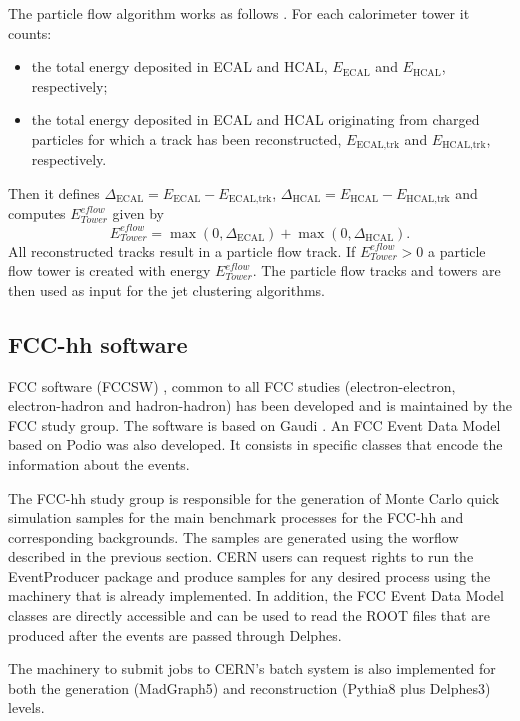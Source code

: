 The particle flow algorithm works as follows \cite{Delphes}. For each calorimeter tower it counts:
\begin{itemize}
	\item the total energy deposited in ECAL and HCAL, $E_{\text{ECAL}}$ and $E_{\text{HCAL}}$, respectively;
	\item the total energy deposited in ECAL and HCAL originating from charged particles for which a track has been reconstructed, $E_{\text{ECAL,trk}}$ and $E_{\text{HCAL,trk}}$, respectively.
\end{itemize}
Then it defines $\Delta_{\text{ECAL}}=E_{\text{ECAL}}-E_{\text{ECAL,trk}}$, $\Delta_{\text{HCAL}}=E_{\text{HCAL}}-E_{\text{HCAL,trk}}$ and computes $E^{eflow}_{Tower}$ given by
\begin{equation}
	E^{eflow}_{Tower}=\max(0,\Delta_{\text{ECAL}})+\max(0,\Delta_{\text{HCAL}}).
\end{equation}
All reconstructed tracks result in a particle flow track. If $E^{eflow}_{Tower}>0$ a particle flow tower is created with energy $E^{eflow}_{Tower}$. The particle flow tracks and towers are then used as input for the jet clustering algorithms.

\subsection{FCC-hh software}
\label{subsec:FCC_software}

FCC software (FCCSW) \cite{FCCSW}, common to all FCC studies (electron-electron, electron-hadron and hadron-hadron) has been developed and is maintained by the FCC study group. The software is based on Gaudi \cite{gaudi}. An FCC Event Data Model based on Podio \cite{Podio} was also developed. It consists in specific classes that encode the information about the events.

The FCC-hh study group is responsible for the generation of Monte Carlo quick simulation samples for the main benchmark processes for the FCC-hh and corresponding backgrounds. The samples are generated using the worflow described in the previous section. CERN users can request rights to run the EventProducer package \cite{FCCEventProducer} and produce samples for any desired process using the machinery that is already implemented. In addition, the FCC Event Data Model classes are directly accessible and can be used to read the ROOT files that are produced after the events are passed through Delphes.

The machinery to submit jobs to CERN's batch system is also implemented for both the generation (MadGraph5) and reconstruction (Pythia8 plus Delphes3) levels.

